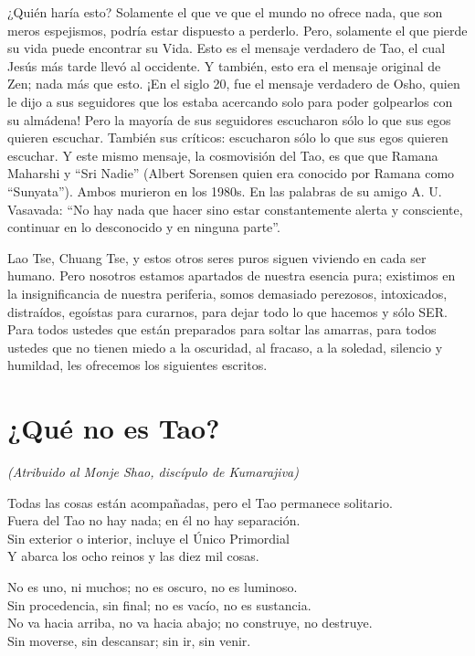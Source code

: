 \documentclass[book,b5paper,hidelinks,final]{memoir}
\begin{document}
	¿Quién haría esto? Solamente el que ve que el mundo no ofrece nada, que
	son meros espejismos, podría estar dispuesto a perderlo. Pero, solamente
	el que pierde su vida puede encontrar su Vida. Esto es el mensaje
	verdadero de Tao, el cual Jesús más tarde llevó al occidente. Y también,
	esto era el mensaje original de Zen; nada más que esto. ¡En el siglo 20,
	fue el mensaje verdadero de Osho, quien le dijo a sus seguidores que los
	estaba acercando solo para poder golpearlos con su almádena! Pero la
	mayoría de sus seguidores escucharon sólo lo que sus egos quieren
	escuchar. También sus críticos: escucharon sólo lo que sus egos quieren
	escuchar. Y este mismo mensaje, la cosmovisión del Tao, es que que
	Ramana Maharshi y ``Sri Nadie'' (Albert Sorensen quien era conocido por
	Ramana como ``Sunyata''). Ambos murieron en los 1980s. En las palabras
	de su amigo A. U. Vasavada: ``No hay nada que hacer sino estar
	constantemente alerta y consciente, continuar en lo desconocido y en
	ninguna parte''.
	
	Lao Tse, Chuang Tse, y estos otros seres puros siguen viviendo en cada
	ser humano. Pero nosotros estamos apartados de nuestra esencia pura;
	existimos en la insignificancia de nuestra periferia, somos demasiado
	perezosos, intoxicados, distraídos, egoístas para curarnos, para dejar
	todo lo que hacemos y sólo SER. Para todos ustedes que están preparados
	para soltar las amarras, para todos ustedes que no tienen miedo a la
	oscuridad, al fracaso, a la soledad, silencio y humildad, les ofrecemos
	los siguientes escritos.
	
	\chapter*{¿Qué no es Tao?}


\textit{(Atribuido al Monje Shao, discípulo de Kumarajiva)}

\vspace{+1\baselineskip}
	
	Todas las cosas están acompañadas, pero el Tao permanece solitario.\\
	Fuera del Tao no hay nada; en él no hay separación.\\
	Sin exterior o interior, incluye el Único Primordial\\
	Y abarca los ocho reinos y las diez mil cosas.
	
	No es uno, ni muchos; no es oscuro, no es luminoso.\\
	Sin procedencia, sin final; no es vacío, no es sustancia.\\
	No va hacia arriba, no va hacia abajo; no construye, no destruye.\\
	Sin moverse, sin descansar; sin ir, sin venir.
	
\end{document}
